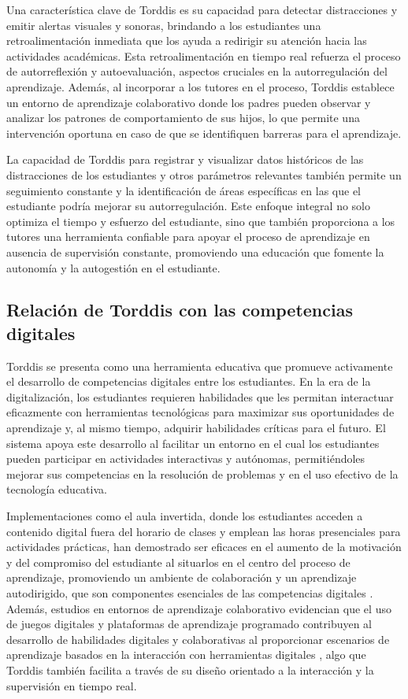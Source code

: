\documentclass[a4paper,fleqn]{cas-sc}
\begin{document}
	Una característica clave de Torddis es su capacidad para detectar distracciones y emitir alertas visuales y sonoras, brindando a los estudiantes una retroalimentación inmediata que los ayuda a redirigir su atención hacia las actividades académicas. Esta retroalimentación en tiempo real refuerza el proceso de autorreflexión y autoevaluación, aspectos cruciales en la autorregulación del aprendizaje. Además, al incorporar a los tutores en el proceso, Torddis establece un entorno de aprendizaje colaborativo donde los padres pueden observar y analizar los patrones de comportamiento de sus hijos, lo que permite una intervención oportuna en caso de que se identifiquen barreras para el aprendizaje.
	
	La capacidad de Torddis para registrar y visualizar datos históricos de las distracciones de los estudiantes y otros parámetros relevantes también permite un seguimiento constante y la identificación de áreas específicas en las que el estudiante podría mejorar su autorregulación. Este enfoque integral no solo optimiza el tiempo y esfuerzo del estudiante, sino que también proporciona a los tutores una herramienta confiable para apoyar el proceso de aprendizaje en ausencia de supervisión constante, promoviendo una educación que fomente la autonomía y la autogestión en el estudiante.
	
	\subsection{Relación de Torddis con las competencias digitales}
	Torddis se presenta como una herramienta educativa que promueve activamente el desarrollo de competencias digitales entre los estudiantes. En la era de la digitalización, los estudiantes requieren habilidades que les permitan interactuar eficazmente con herramientas tecnológicas para maximizar sus oportunidades de aprendizaje y, al mismo tiempo, adquirir habilidades críticas para el futuro. El sistema apoya este desarrollo al facilitar un entorno en el cual los estudiantes pueden participar en actividades interactivas y autónomas, permitiéndoles mejorar sus competencias en la resolución de problemas y en el uso efectivo de la tecnología educativa.
	
	Implementaciones como el aula invertida, donde los estudiantes acceden a contenido digital fuera del horario de clases y emplean las horas presenciales para actividades prácticas, han demostrado ser eficaces en el aumento de la motivación y del compromiso del estudiante al situarlos en el centro del proceso de aprendizaje, promoviendo un ambiente de colaboración y un aprendizaje autodirigido, que son componentes esenciales de las competencias digitales \citep{Mohamed2018Implementing}. Además, estudios en entornos de aprendizaje colaborativo evidencian que el uso de juegos digitales y plataformas de aprendizaje programado contribuyen al desarrollo de habilidades digitales y colaborativas al proporcionar escenarios de aprendizaje basados en la interacción con herramientas digitales \citep{Echeverria2011AFramework}, algo que Torddis también facilita a través de su diseño orientado a la interacción y la supervisión en tiempo real.
	
\end{document}
